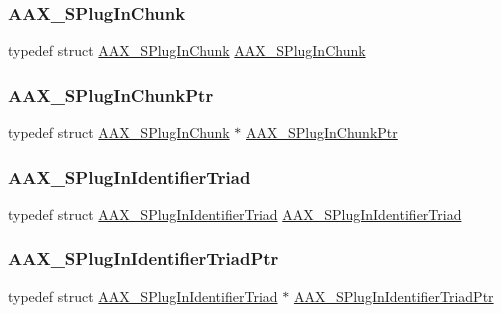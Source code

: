 \subsubsection{\texorpdfstring{AAX\_SPlugInChunk}{AAX\_SPlugInChunk}}
{\footnotesize\ttfamily typedef struct \mbox{\hyperlink{a01421}{A\+A\+X\+\_\+\+S\+Plug\+In\+Chunk}} \mbox{\hyperlink{a01421}{A\+A\+X\+\_\+\+S\+Plug\+In\+Chunk}}}

\mbox{\label{a00392_ab215ba217e7d757be9ef167dfd8fa23a}} 
\subsubsection{\texorpdfstring{AAX\_SPlugInChunkPtr}{AAX\_SPlugInChunkPtr}}
{\footnotesize\ttfamily typedef struct \mbox{\hyperlink{a01421}{A\+A\+X\+\_\+\+S\+Plug\+In\+Chunk}} $\ast$ \mbox{\hyperlink{a00392_ab215ba217e7d757be9ef167dfd8fa23a}{A\+A\+X\+\_\+\+S\+Plug\+In\+Chunk\+Ptr}}}

\mbox{\label{a00392_aa20951c2f27c7f5ff8ea4f92a893e29c}} 
\subsubsection{\texorpdfstring{AAX\_SPlugInIdentifierTriad}{AAX\_SPlugInIdentifierTriad}}
{\footnotesize\ttfamily typedef struct \mbox{\hyperlink{a01425}{A\+A\+X\+\_\+\+S\+Plug\+In\+Identifier\+Triad}} \mbox{\hyperlink{a01425}{A\+A\+X\+\_\+\+S\+Plug\+In\+Identifier\+Triad}}}

\mbox{\label{a00392_af0e64ac48db3c92acf98646b97a69f88}} 
\subsubsection{\texorpdfstring{AAX\_SPlugInIdentifierTriadPtr}{AAX\_SPlugInIdentifierTriadPtr}}
{\footnotesize\ttfamily typedef struct \mbox{\hyperlink{a01425}{A\+A\+X\+\_\+\+S\+Plug\+In\+Identifier\+Triad}} $\ast$ \mbox{\hyperlink{a00392_af0e64ac48db3c92acf98646b97a69f88}{A\+A\+X\+\_\+\+S\+Plug\+In\+Identifier\+Triad\+Ptr}}}



